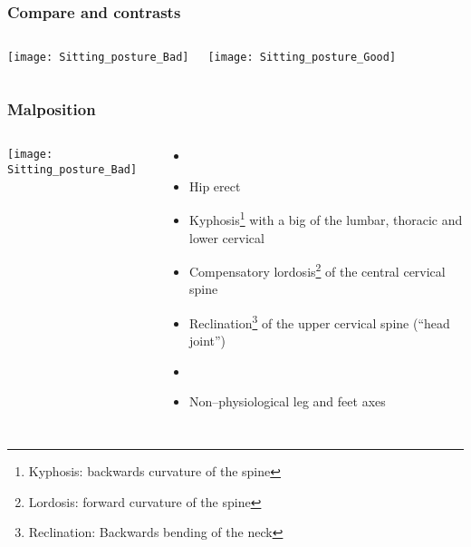 \begin{frame}
\frametitle{Compare and contrasts}
\hypertarget{compare}{}
\begin{columns}[c] %


\texttt{[image: Sitting\_posture\_Bad]}

\texttt{[image: Sitting\_posture\_Good]}
\end{columns}
\end{frame}

\begin{frame}
\frametitle{Malposition}
\begin{columns}[c] %
\texttt{[image: Sitting\_posture\_Bad]}

\begin{itemize}
\item[1.] 
\item[2.] Hip erect
\item[3.] Kyphosis\footnote{Kyphosis: backwards curvature of the spine} with a big  of the lumbar, thoracic and lower cervical 
\item[4.] Compensatory lordosis\footnote{Lordosis: forward curvature of the spine} of the central cervical spine
\item[5.] Reclination\footnote{Reclination: Backwards bending of the neck} of the upper cervical spine (``head joint'')
\item[6.] 
\item[7.] Non--physiological leg and feet axes
\end{itemize}


\end{columns}
\end{frame}

